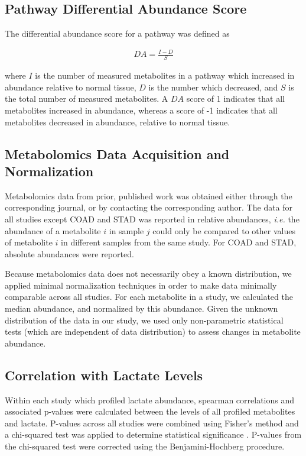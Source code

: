 \documentclass[10pt]{article}
\begin{document}
\subsection{Pathway Differential Abundance Score}
The differential abundance score for a pathway was defined as

\begin{align*}
DA = \frac{I - D}{S}
\end{align*}

\noindent where $I$ is the number of measured metabolites in a pathway which increased in abundance relative to normal tissue, $D$ is the number which decreased, and $S$ is the total number of measured metabolites. A $DA$ score of 1 indicates that all metabolites increased in abundance, whereas a score of -1 indicates that all metabolites decreased in abundance, relative to normal tissue.

\subsection{Metabolomics Data Acquisition and Normalization}
Metabolomics data from prior, published work was obtained either through the corresponding journal, or by contacting the corresponding author. The data for all studies except COAD and STAD was reported in relative abundances, \textit{i.e.} the abundance of a metabolite $i$ in sample $j$ could only be compared to other values of metabolite $i$ in different samples from the same study. For COAD and STAD, absolute abundances were reported.

Because metabolomics data does not necessarily obey a known distribution, we applied minimal normalization techniques in order to make data minimally comparable across all studies. For each metabolite in a study, we calculated the median abundance, and normalized by this abundance. Given the unknown distribution of the data in our study, we used only non-parametric statistical tests (which are independent of data distribution) to assess changes in metabolite abundance.

\subsection{Correlation with Lactate Levels}
Within each study which profiled lactate abundance, spearman correlations and associated p-values were calculated between the levels of all profiled metabolites and lactate. P-values across all studies were combined using Fisher's method and a chi-squared test was applied to determine statistical significance \cite{Whitlock2005}. P-values from the chi-squared test were corrected using the Benjamini-Hochberg procedure.
\end{document}
